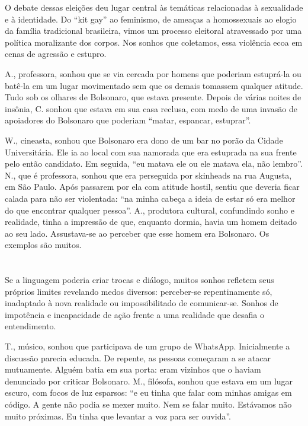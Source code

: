 O debate dessas eleições deu lugar central às temáticas relacionadas à
sexualidade e à identidade. Do ``kit gay'' ao feminismo, de ameaças a
homossexuais ao elogio da família tradicional brasileira, vimos um
processo eleitoral atravessado por uma política moralizante dos corpos.
Nos sonhos que coletamos, essa violência ecoa em cenas de agressão e
estupro.

A., professora, sonhou que se via cercada por homens que poderiam
estuprá-la ou batê-la em um lugar movimentado sem que os demais tomassem
qualquer atitude. Tudo sob os olhares de Bolsonaro, que estava presente.
Depois de várias noites de insônia, C. sonhou que estava em sua casa
reclusa, com medo de uma invasão de apoiadores do Bolsonaro que poderiam
``matar, espancar, estuprar''.

W., cineasta, sonhou que Bolsonaro era dono de um bar no porão da Cidade
Universitária. Ele ia ao local com sua namorada que era estuprada na sua
frente pelo então candidato. Em seguida, ``eu matava ele ou ele matava
ela, não lembro''. N., que é professora, sonhou que era perseguida por
skinheads na rua Augusta, em São Paulo. Após passarem por ela com
atitude hostil, sentiu que deveria ficar calada para não ser violentada:
``na minha cabeça a ideia de estar só era melhor do que encontrar
qualquer pessoa''. A., produtora cultural, confundindo sonho e
realidade, tinha a impressão de que, enquanto dormia, havia um homem
deitado ao seu lado. Assustava-se ao perceber que esse homem era
Bolsonaro. Os exemplos são muitos.

\section*{}

Se a linguagem poderia criar trocas e diálogo, muitos sonhos refletem
seus próprios limites revelando medos diversos: perceber-se
repentinamente só, inadaptado à nova realidade ou impossibilitado de
comunicar-se. Sonhos de impotência e incapacidade de ação frente a uma
realidade que desafia o entendimento.

T., músico, sonhou que participava de um grupo de WhatsApp. Inicialmente
a discussão parecia educada. De repente, as pessoas começaram a se
atacar mutuamente. Alguém batia em sua porta: eram vizinhos que o haviam
denunciado por criticar Bolsonaro. M., filósofa, sonhou que estava em um
lugar escuro, com focos de luz esparsos: ``e eu tinha que falar com
minhas amigas em código. A gente não podia se mexer muito. Nem se falar
muito. Estávamos não muito próximas. Eu tinha que levantar a voz para
ser ouvida''.

